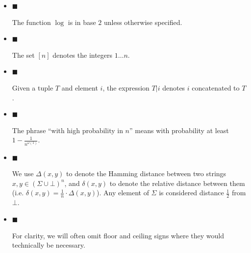 \begin{itemize}


\item[] 
$\blacksquare$ 


The function $\log$ is in base $2$ unless otherwise specified.\par





\item[] 
$\blacksquare$ 


The set $[n]$ denotes the integers $1\ldots n$.\par





\item[] 
$\blacksquare$ 


Given a tuple $T$ and element $i$, the expression $T|i$ denotes $i$ concatenated to $T$.\par





\item[] 
$\blacksquare$ 


The phrase “with high probability in $n$” means with probability at least $1-\frac{1}{n^{\omega(1)}}$.\par





\item[] 
$\blacksquare$ 


We use $\Delta(x,y)$ to denote the Hamming distance between two strings $x,y\in(\Sigma\cup\bot)^{n}$, and $\delta(x,y)$ to denote the relative distance between them (i.e. $\delta(x,y)=\frac{1}{n}\cdot\Delta(x,y)$). Any element of $\Sigma$ is considered distance $\frac{1}{2}$ from $\bot$.\par





\item[] 
$\blacksquare$ 


For clarity, we will often omit floor and ceiling signs where they would technically be necessary.\par





\end{itemize}





